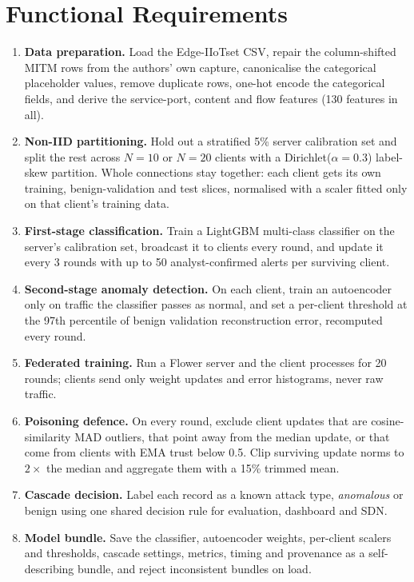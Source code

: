 \section{Functional Requirements}
\begin{enumerate}
  \item[FR1] \textbf{Data preparation.} Load the Edge-IIoTset CSV, repair the column-shifted MITM rows from the authors' own capture, canonicalise the categorical placeholder values, remove duplicate rows, one-hot encode the categorical fields, and derive the service-port, content and flow features (130 features in all).
  \item[FR2] \textbf{Non-IID partitioning.} Hold out a stratified 5\% server calibration set and split the rest across $N=10$ or $N=20$ clients with a Dirichlet($\alpha=0.3$) label-skew partition. Whole connections stay together: each client gets its own training, benign-validation and test slices, normalised with a scaler fitted only on that client's training data.
  \item[FR3] \textbf{First-stage classification.} Train a LightGBM multi-class classifier on the server's calibration set, broadcast it to clients every round, and update it every 3 rounds with up to 50 analyst-confirmed alerts per surviving client.
  \item[FR4] \textbf{Second-stage anomaly detection.} On each client, train an autoencoder only on traffic the classifier passes as normal, and set a per-client threshold at the 97th percentile of benign validation reconstruction error, recomputed every round.
  \item[FR5] \textbf{Federated training.} Run a Flower server and the client processes for 20 rounds; clients send only weight updates and error histograms, never raw traffic.
  \item[FR6] \textbf{Poisoning defence.} On every round, exclude client updates that are cosine-similarity MAD outliers, that point away from the median update, or that come from clients with EMA trust below 0.5. Clip surviving update norms to $2\times$ the median and aggregate them with a 15\% trimmed mean.
  \item[FR7] \textbf{Cascade decision.} Label each record as a known attack type, \emph{anomalous} or benign using one shared decision rule for evaluation, dashboard and SDN.
  \item[FR8] \textbf{Model bundle.} Save the classifier, autoencoder weights, per-client scalers and thresholds, cascade settings, metrics, timing and provenance as a self-describing bundle, and reject inconsistent bundles on load.

\end{enumerate}
